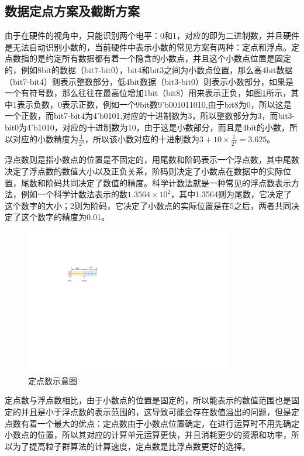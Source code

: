 \subsection{数据定点方案及截断方案}
由于在硬件的视角中，只能识别两个电平：0和1，对应的即为二进制数，并且硬件是无法自动识别小数的，当前硬件中表示小数的常见方案有两种：定点和浮点。定点数指的是约定所有数据都有着一个隐含的小数点，并且这个小数点位置是固定的，例如8bit的数据（bit7-bit0），bit4和bit3之间为小数点位置，那么高4bit数据（bit7-bit4）则表示整数部分，低4bit数据（bit3-bit0）则表示小数部分，如果是一个有符号数，那么往往在最高位增加1bit（bit8）用来表示正负，如图\ref{fig:定点数示意图}所示，其中1表示负数，0表示正数，例如一个9bit数9'b001011010,由于bit8为0，所以这是一个正数，而bit7-bit4为4'b0101,对应的十进制数为3，所以整数部分为3，而bit3-bit0为4'b1010，对应的十进制数为10，由于这是小数部分，而且是4bit的小数，所以对应的小数精度为$\frac{1}{2^4}$，所以该小数对应的十进制数为$3+10\times\frac{1}{2^4}=3.625$。

浮点数则是指小数点的位置是不固定的，用尾数和阶码表示一个浮点数，其中尾数决定了浮点数的数值大小以及正负关系，阶码则决定了小数点在数据中的实际位置，尾数和阶码共同决定了数值的精度。科学计数法就是一种常见的浮点数表示方法，例如一个科学计数法表示的数$1.3564\times10^{2}$，其中1.3564则为尾数，它决定了这个数字的大小；2则为阶码，它决定了小数点的实际位置是在5之后，两者共同决定了这个数字的精度为0.01。
\begin{figure}[htb]
  \centering
  \includegraphics[width=9cm]{fig/4-fig/定点数示意图.drawio.pdf}
  \caption{定点数示意图}
  \label{fig:定点数示意图}
\end{figure}

定点数与浮点数相比，由于小数点的位置是固定的，所以能表示的数值范围也是固定的并且是小于浮点数的表示范围的，这导致可能会存在数值溢出的问题，但是定点数有着一个最大的优点：定点数由于小数点位置确定，在进行运算时不用先确定小数点的位置，所以其对应的计算单元运算更快，并且消耗更少的资源和功率，所以为了提高粒子群算法的计算速度，定点数是比浮点数更好的选择\cite{潘树朋2021基于,徐飞0基于,2018TheDesign,2021Higherprecision}。

